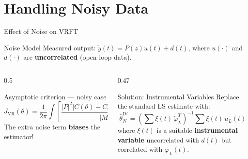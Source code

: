 \documentclass[aspectratio=169]{beamer}
\newcommand{\alerttext}[1]{{\color{alertred}\textbf{#1}}}
\begin{document}
\section{Handling Noisy Data}

\begin{frame}{Effect of Noise on VRFT}
  \begin{block}{Noise Model}
    Measured output: $\tilde{y}(t) = P(z)u(t) + d(t)$, where $u(\cdot)$ and $d(\cdot)$ are \textbf{uncorrelated} (open-loop data).
  \end{block}
  \vspace{0.3em}
  \begin{columns}[T]
    \begin{column}{0.5\textwidth}
      \begin{block}{Asymptotic criterion — noisy case}
        \small
        \[
          J_{\mathrm{VR}}(\theta) = \frac{1}{2\pi}\!\int \!\left[\frac{|P|^2|C(\theta)-C_0|^2|1-M|^2|L|^2}{|M|^2}\Phi_u + \frac{|C(\theta)|^2|P|^2|C_0|^2|L|^2}{\cdot}\Phi_d\right]d\omega
        \]
        The extra noise term \alerttext{biases} the estimator!
      \end{block}
    \end{column}
    \begin{column}{0.47\textwidth}
      \begin{alertblock}{Solution: Instrumental Variables}
        Replace the standard LS estimate with:
        \[
          \hat{\theta}^{\mathrm{IV}}_N = \left(\sum \xi(t)\,\tilde{\varphi}_L^T\right)^{-1}\sum \xi(t)\,u_L(t)
        \]
        where $\xi(t)$ is a suitable \textbf{instrumental variable} uncorrelated with $d(t)$ but correlated with $\varphi_L(t)$.
      \end{alertblock}
    \end{column}
  \end{columns}
\end{frame}
\end{document}
